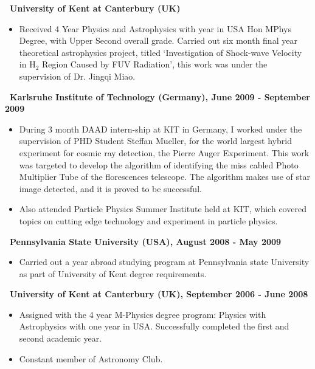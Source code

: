 \documentclass[a4paper,12pt]{letter}
\begin{document}
\textbf{\normalsize ~University of Kent at Canterbury (UK)}

\begin{itemize}
\item \textrm{\normalsize Received 4 Year Physics and Astrophysics with year in USA Hon MPhys Degree, with Upper Second overall grade. Carried out six month final year theoretical astrophysics project, titled \lq Investigation of Shock-wave Velocity in H$_2$ Region Caused by FUV Radiation\rq, this work was under the supervision of Dr. Jingqi Miao.} 

\end{itemize}

\textbf{\normalsize ~Karlsruhe Institute of Technology (Germany), June 2009 - September 2009}
\begin{itemize}
\item \textrm{\normalsize During 3 month DAAD intern-ship at KIT in Germany, I worked under the supervision of PHD Student Steffan Mueller, for the world largest hybrid experiment for cosmic ray detection, the Pierre Auger Experiment. This work was targeted to develop the algorithm of identifying the miss cabled Photo Multiplier Tube of the florescences telescope. The algorithm makes use of star image detected, and it is proved to be successful.}
\item \textrm{\normalsize Also attended Particle Physics Summer Institute held at KIT, which covered topics on cutting edge technology and experiment in particle physics.}
\end{itemize}

\textbf{\normalsize ~Pennsylvania State University (USA), August 2008 - May 2009}

\begin{itemize}
\item \textrm{\normalsize Carried out a year abroad studying program at Pennsylvania state University as part of University of Kent degree requirements.}
\end{itemize}

\textbf{\normalsize ~University of Kent at Canterbury (UK), September 2006 - June 2008}
\begin{itemize}
\item \textrm{\normalsize Assigned with the 4 year M-Physics degree program: Physics with Astrophysics with one year in USA. Successfully completed the first and second academic year.}
\item \textrm{\normalsize Constant member of Astronomy Club.}
\end{itemize}
\end{document}

